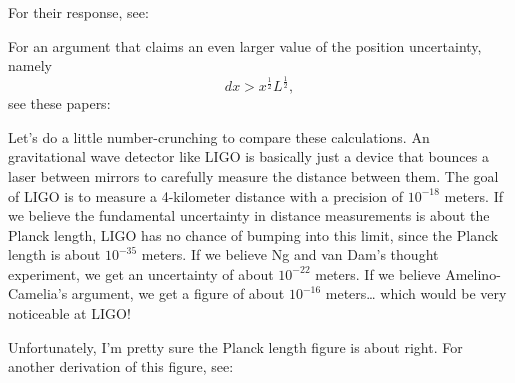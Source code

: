 \documentclass{article}
\def\tightlist{}
\renewcommand{\texttt}[1]{%
  \begingroup
  \ttfamily
  \begingroup\lccode`~=`/\lowercase{\endgroup\def~}{/\discretionary{}{}{}}%
  \begingroup\lccode`~=`[\lowercase{\endgroup\def~}{[\discretionary{}{}{}}%
  \begingroup\lccode`~=`.\lowercase{\endgroup\def~}{.\discretionary{}{}{}}%
  \catcode`/=\active\catcode`[=\active\catcode`.=\active
  \scantokens{#1\noexpand}%
  \endgroup
}
\begin{document}
For their response, see:


For an argument that claims an even larger value of the position
uncertainty, namely \[dx > x^{\frac12} L^{\frac12},\] see these papers:


Let's do a little number-crunching to compare these calculations. An
gravitational wave detector like LIGO is basically just a device that
bounces a laser between mirrors to carefully measure the distance
between them. The goal of LIGO is to measure a 4-kilometer distance with
a precision of \(10^{-18}\) meters. If we believe the fundamental
uncertainty in distance measurements is about the Planck length, LIGO
has no chance of bumping into this limit, since the Planck length is
about \(10^{-35}\) meters. If we believe Ng and van Dam's thought
experiment, we get an uncertainty of about \(10^{-22}\) meters. If we
believe Amelino-Camelia's argument, we get a figure of about
\(10^{-16}\) meters\ldots{} which would be very noticeable at LIGO!

Unfortunately, I'm pretty sure the Planck length figure is about right.
For another derivation of this figure, see:

\end{document}
